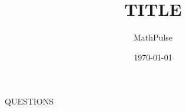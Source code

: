 \documentclass{elegantbook}
\title{{TITLE}}
\author{MathPulse}
\date{\today}
\begin{document}
\maketitle
\tableofcontents
{QUESTIONS}
\end{document}
